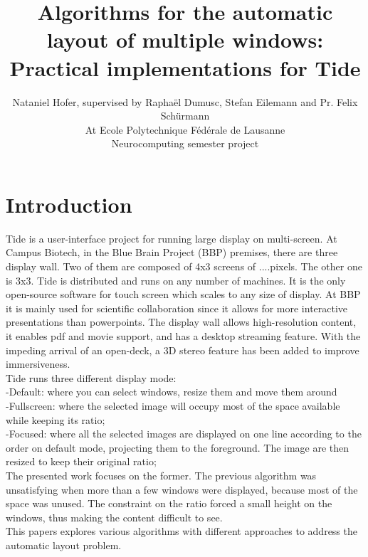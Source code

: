 \documentclass{acmtog}
\begin{document}
\makeatletter
\def\runningfoot{\def\@runningfoot{}}
\def\firstfoot{\def\@firstfoot{}}
\makeatother



\title{Algorithms for the automatic layout of multiple windows: \\Practical implementations for Tide}

\author{Nataniel Hofer, supervised by Raphaël Dumusc, Stefan Eilemann and Pr. Felix Schürmann \\
At Ecole Polytechnique Fédérale de Lausanne\\
Neurocomputing semester project}

\maketitle

\section{Introduction}
Tide is a user-interface project for running large display on multi-screen. At Campus Biotech, in the Blue Brain Project (BBP) premises, there are three display wall. Two of them are composed of 4x3 screens of ....pixels. The other one is 3x3. Tide is distributed and runs on any number of machines. It is the only open-source software for touch screen which scales to any size of display. At BBP it is mainly used for scientific collaboration since it allows for more interactive presentations  than powerpoints. The display wall allows  high-resolution content, it enables pdf and movie support, and has a desktop streaming feature. With the impeding arrival of an open-deck, 
a 3D stereo feature has been added to improve immersiveness. \\
Tide runs three different display mode:\\
-Default: where you can select windows, resize them and move them around \\
-Fullscreen: where the selected image will occupy most of the space available while keeping its ratio; \\
-Focused: where  all the selected images are displayed on one line according to the order on default mode, projecting them to the foreground. The image are then resized to keep their original ratio;\\
The presented work focuses on the former. 
The previous algorithm was unsatisfying when more than a few windows were displayed, because most of the space was unused. The constraint on the ratio forced a small height on the windows, thus making the content difficult to see.  \\
This papers explores various algorithms with different approaches to address the automatic layout problem.\\
\end{document}
